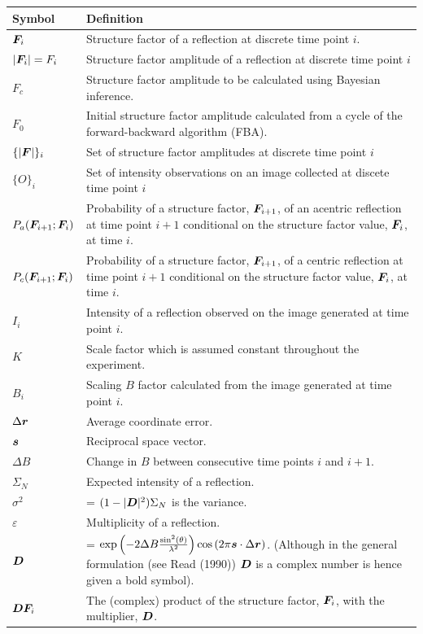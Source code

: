 \begin{center}
    \begin{tabular}{ l | p{13cm} }
        Symbol & Definition \\
        \hline
        $\boldsymbol{F}_i$         & Structure factor of a reflection at discrete time point $i$. \\
        $|\boldsymbol{F}_i| = F_i$ & Structure factor amplitude of a reflection at discrete time point $i$\\
        $F_c$              & Structure factor amplitude to be calculated using Bayesian inference.\\
        $F_0$              & Initial structure factor amplitude calculated from a cycle of the forward-backward algorithm (FBA). \\ 
        $\{|\boldsymbol{F}|\}_i$   & Set of structure factor amplitudes at discrete time point $i$ \\
        $\{O\}_i$          & Set of intensity observations on an image collected at discete time point $i$ \\
        $P_a(\boldsymbol{F}_{i+1} ; \boldsymbol{F}_i)$ & Probability of a structure factor, $\boldsymbol{F}_{i+1}$, of an acentric reflection at time point $i+1$ conditional on the structure factor value, $\boldsymbol{F}_i$, at time $i$. \\
        $P_c(\boldsymbol{F}_{i+1} ; \boldsymbol{F}_i)$ & Probability of a structure factor, $\boldsymbol{F}_{i+1}$, of a centric reflection at time point $i+1$ conditional on the structure factor value, $\boldsymbol{F}_i$, at time $i$.\\
        $I_i$              & Intensity of a reflection observed on the image generated at time point $i$.\\
        $K$                & Scale factor which is assumed constant throughout the experiment. \\
        $B_i$              & Scaling $B$ factor calculated from the image generated at time point $i$.\\
        $\Delta \boldsymbol{r}$    & Average coordinate error.\\
        $\boldsymbol{s}$           & Reciprocal space vector. \\
        $\Delta B$         & Change in $B$ between consecutive time points $i$ and $i+1$. \\
        $\Sigma_N$         & Expected intensity of a reflection. \\
        $\sigma^2$         & = $(1 - |\boldsymbol{D}|^2)\Sigma_N$ is the variance. \\
        $\varepsilon$      & Multiplicity of a reflection. \\
        $\boldsymbol{D}$           & = $\exp \left( -2\Delta B \frac{\sin^2(\theta)}{\lambda^2} \right) \cos \left( 2 \pi \boldsymbol{s} \cdot \Delta \boldsymbol{r} \right)$. (Although in the general formulation (see Read (1990)) $\boldsymbol{D}$ is a complex number is hence given a bold symbol).\\
        $\boldsymbol{D}\boldsymbol{F}_i$   & The (complex) product of the structure factor, $\boldsymbol{F}_i$, with the multiplier, $\boldsymbol{D}$. \\
    \end{tabular}
\end{center}


